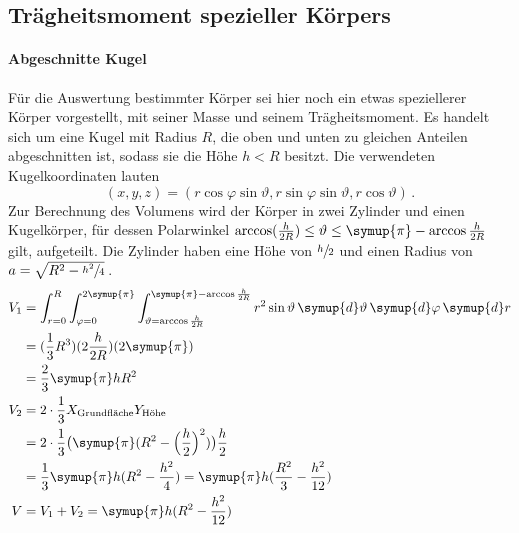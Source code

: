 \subsection{Trägheitsmoment spezieller Körpers}
\label{sub:Trägheitsmoment}

\paragraph{Abgeschnitte Kugel}

Für die Auswertung bestimmter Körper sei hier noch ein etwas speziellerer Körper vorgestellt, mit seiner Masse und seinem 
Trägheitsmoment. 
Es handelt sich um eine Kugel mit Radius $R$, die oben und unten zu gleichen Anteilen \glqq abgeschnitten\grqq{} ist, sodass 
sie die Höhe ${h<R}$ besitzt. 
Die verwendeten Kugelkoordinaten lauten 
\begin{equation}
    (x,y,z)=(r\cos \varphi \sin \vartheta, r\sin \varphi \sin \vartheta, r\cos \vartheta) \,.
\end{equation}
Zur Berechnung des Volumens wird der Körper in zwei Zylinder und einen Kugelkörper, für dessen Polarwinkel 
${\arccos (\frac{h}{2R})\le\vartheta\le\symup{\pi}-\arccos{\frac{h}{2R}}}$ gilt, aufgeteilt. 
Die Zylinder haben eine Höhe von ${\sfrac{h}{2}}$ und einen Radius von ${a=\sqrt{R^2-\sfrac{h^2}{4}}}\,$. 
\begin{align}
    V_1&=\int_{r=0}^R \int_{\varphi=0}^{2\symup{\pi}} \int_{\vartheta=\arccos{\frac{h}{2R}}}^{\symup{\pi}-\arccos{\frac{h}{2R}}} 
        r^2\sin{\vartheta} \, \symup{d}\vartheta \, \symup{d}\varphi \, \symup{d}r \\
        &= (\frac{1}{3}R^3) (2\frac{h}{2R}) (2\symup{\pi}) \\
        &= \frac{2}{3}\symup{\pi}hR^2 \\
    V_2&= 2\cdot\frac{1}{3} X_\text{Grundfläche} Y_\text{Höhe} \\
        &= 2\cdot\frac{1}{3} \bigl(\symup{\pi} (R^2-\Bigl(\frac{h}{2}\Bigr)^2)\bigr) \frac{h}{2} \\
        &= \frac{1}{3}\symup{\pi}h(R^2-\frac{h^2}{4}) = \symup{\pi}h(\frac{R^2}{3}-\frac{h^2}{12}) \\
    V&=V_1+V_2=\symup{\pi}h(R^2-\frac{h^2}{12})
\end{align}
